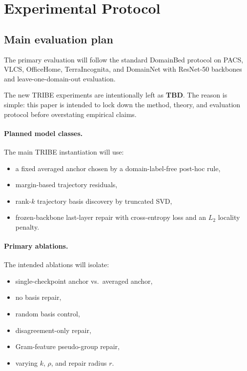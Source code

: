\documentclass{article}
\newcommand{\TBD}{\textbf{TBD}}
\newcommand{\tribe}{\textup{\textsc{TRIBE}}}
\newcommand{\1}{\mathbbm{1}}
\begin{document}
\section{Experimental Protocol}
\label{sec:experiments}

\subsection{Main evaluation plan}

The primary evaluation will follow the standard DomainBed protocol \citep{gulrajani2021domainbed,cha2021swad} on PACS, VLCS, OfficeHome, TerraIncognita, and DomainNet with ResNet-50 backbones and leave-one-domain-out evaluation.

The new \tribe{} experiments are intentionally left as \TBD{}. The reason is simple: this paper is intended to lock down the method, theory, and evaluation protocol before overstating empirical claims.

\paragraph{Planned model classes.}
The main \tribe{} instantiation will use:
\begin{itemize}[leftmargin=1.4em]
    \item a fixed averaged anchor chosen by a domain-label-free post-hoc rule,
    \item margin-based trajectory residuals,
    \item rank-\(k\) trajectory basis discovery by truncated SVD,
    \item frozen-backbone last-layer repair with cross-entropy loss and an \(L_2\) locality penalty.
\end{itemize}

\paragraph{Primary ablations.}
The intended ablations will isolate:
\begin{itemize}[leftmargin=1.4em]
    \item single-checkpoint anchor vs.\ averaged anchor,
    \item no basis repair,
    \item random basis control,
    \item disagreement-only repair,
    \item Gram-feature pseudo-group repair,
    \item varying \(k\), \(\rho\), and repair radius \(r\).
\end{itemize}
\end{document}
